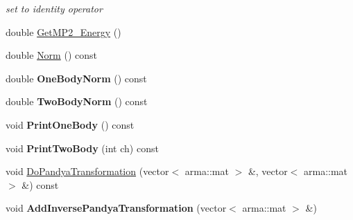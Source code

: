 \begin{DoxyCompactItemize}
\begin{DoxyCompactList}\small\item\em set to identity operator \end{DoxyCompactList}\item 
double \hyperlink{classOperator_ad7639b562a3df5215000677b1dc499e6}{Get\-M\-P2\-\_\-\-Energy} ()
\item 
double \hyperlink{classOperator_acb9d7959232a636191b91f6bf5b7b0c8}{Norm} () const 
\item 
\hypertarget{classOperator_a72dc7aea85c7775097d235de6f17f330}{double {\bfseries One\-Body\-Norm} () const }\label{classOperator_a72dc7aea85c7775097d235de6f17f330}

\item 
\hypertarget{classOperator_af1c40bdef64ec9abd5d95e8328565a67}{double {\bfseries Two\-Body\-Norm} () const }\label{classOperator_af1c40bdef64ec9abd5d95e8328565a67}

\item 
\hypertarget{classOperator_a5ec5a8110337108ac31d3af7337e454b}{void {\bfseries Print\-One\-Body} () const }\label{classOperator_a5ec5a8110337108ac31d3af7337e454b}

\item 
\hypertarget{classOperator_a905e42cefafaca0eb155cf41b3cd37b8}{void {\bfseries Print\-Two\-Body} (int ch) const }\label{classOperator_a905e42cefafaca0eb155cf41b3cd37b8}

\item 
void \hyperlink{classOperator_afb10f04b274a9ed8a599910a2a5fc0e3}{Do\-Pandya\-Transformation} (vector$<$ arma\-::mat $>$ \&, vector$<$ arma\-::mat $>$ \&) const 
\item 
\hypertarget{classOperator_a52dbcde640637889ab6a1dd90e1ceb62}{void {\bfseries Add\-Inverse\-Pandya\-Transformation} (vector$<$ arma\-::mat $>$ \&)}\label{classOperator_a52dbcde640637889ab6a1dd90e1ceb62}


\end{DoxyCompactItemize}
